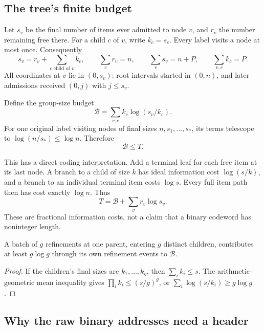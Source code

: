 \subsection{The tree's finite budget}

Let \(s_v\) be the final number of items ever admitted to node \(v\), and \(r_v\) the number remaining free there. For a child \(c\) of \(v\), write \(k_c=s_c\). Every label visits a node at most once. Consequently
\[
s_v=r_v+\sum_{c\text{ child of }v}k_c,\qquad
\sum_vr_v=n,\qquad \sum_vs_v=n+P,\qquad\sum_{v,c}k_c=P.
\]
All coordinates at \(v\) lie in \((0,s_v)\): root intervals started in \((0,n)\), and later admissions received \((0,j)\) with \(j\le s_v\).

Define the group-size budget
\begin{equation}\label{eq:budget}
\mathcal B=\sum_{v,c}k_c\log(s_v/k_c).
\end{equation}
For one original label visiting nodes of final sizes \(n,s_1,\ldots,s_*\), its terms telescope to \(\log(n/s_*)\le\log n\). Therefore
\begin{equation}\label{eq:entropy}
\mathcal B\le T.
\end{equation}

This has a direct coding interpretation. Add a terminal leaf for each free item at its last node. A branch to a child of size \(k\) has ideal information cost \(\log(s/k)\), and a branch to an individual terminal item costs \(\log s\). Every full item path then has cost exactly \(\log n\). Thus
\[
T=\mathcal B+\sum_v r_v\log s_v.
\]
These are fractional information costs, not a claim that a binary codeword has noninteger length.

\begin{lemma}\label{lem:batch}
A batch of \(g\) refinements at one parent, entering \(g\) distinct children, contributes at least \(g\log g\) through its own refinement events to \(\mathcal B\).
\end{lemma}
\begin{proof}
If the children's final sizes are \(k_1,\ldots,k_g\), then \(\sum_i k_i\le s\). The arithmetic--geometric mean inequality gives \(\prod_i k_i\le(s/g)^g\), or \(\sum_i\log(s/k_i)\ge g\log g\).
\end{proof}

\subsection{Why the raw binary addresses need a header}

